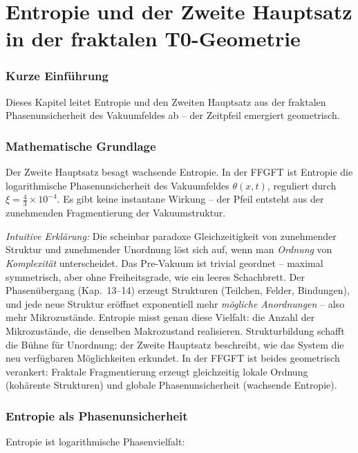 \chapter{Entropie und der Zweite Hauptsatz in der fraktalen T0-Geometrie}


	
	\subsection*{Kurze Einführung}
	
	Dieses Kapitel leitet Entropie und den Zweiten Hauptsatz aus der fraktalen Phasenunsicherheit des Vakuumfeldes ab – der Zeitpfeil emergiert geometrisch.
	
	\subsection*{Mathematische Grundlage}
	
	Der Zweite Hauptsatz besagt wachsende Entropie. In der FFGFT ist Entropie die logarithmische Phasenunsicherheit des Vakuumfeldes \(\theta(x,t)\), reguliert durch \(\xi = \frac{4}{3} \times 10^{-4}\). Es gibt keine instantane Wirkung – der Pfeil entsteht aus der zunehmenden Fragmentierung der Vakuumstruktur.
	
	\textit{Intuitive Erklärung:} Die scheinbar paradoxe Gleichzeitigkeit von zunehmender Struktur und zunehmender Unordnung löst sich auf, wenn man \textit{Ordnung} von \textit{Komplexität} unterscheidet. Das Pre-Vakuum ist trivial geordnet -- maximal symmetrisch, aber ohne Freiheitsgrade, wie ein leeres Schachbrett. Der Phasenübergang (Kap.~13--14) erzeugt Strukturen (Teilchen, Felder, Bindungen), und jede neue Struktur eröffnet exponentiell mehr \textit{mögliche Anordnungen} -- also mehr Mikrozustände. Entropie misst genau diese Vielfalt: die Anzahl der Mikrozustände, die denselben Makrozustand realisieren. Strukturbildung schafft die Bühne für Unordnung; der Zweite Hauptsatz beschreibt, wie das System die neu verfügbaren Möglichkeiten erkundet. In der FFGFT ist beides geometrisch verankert: Fraktale Fragmentierung erzeugt gleichzeitig lokale Ordnung (kohärente Strukturen) und globale Phasenunsicherheit (wachsende Entropie).

	\subsection*{Entropie als Phasenunsicherheit}
	
	Entropie ist logarithmische Phasenvielfalt:
	

